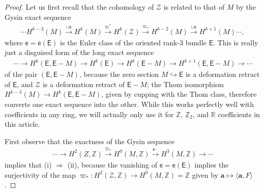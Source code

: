 \documentclass[pdftex]{sigma}
\numberwithin{equation}{section}
\def\ZZ{\mathbb{Z}}
\def\RR{\mathbb{R}}
\begin{document}
\begin{proof}
Let us first recall that the cohomology of
$\mathcal{Z}$ is related to that of $M$ by the Gysin exact sequence \cite[Section~12]{milnorstaf}
\begin{gather}\label{geyser}
 \cdots H^{k-3}(M)\stackrel{\cup \mathsf{e}}{\to} H^{k}(M)\stackrel{\varpi^*}{\to} H^{k}(\mathcal{Z})\stackrel{\varpi_*}{\to}
 H^{k-2}(M) \stackrel{\cup
 \mathsf{e}}{\to} H^{k+1}(M) \cdots,
\end{gather}
where $\mathsf{e}= \mathsf{e}( \mathsf{E})$ is the Euler class of the oriented rank-$3$ bundle $\mathsf{E}$.
This is really just a disguised form of the long exact sequence
\begin{gather*}
 \cdots \to H^{k}(\mathsf{E}, \mathsf{E}-M){\to} H^{k}(\mathsf{E}){\to} H^{k}(\mathsf{E}-M){\to}
 H^{k+1}(\mathsf{E}, \mathsf{E}-M) \to \cdots
\end{gather*}
of the pair $(\mathsf{E}, \mathsf{E}-M)$, because the zero section $M\hookrightarrow \mathsf{E}$ is a
deformation retract of $\mathsf{E}$, and $\mathcal{Z}$ is a deformation retract of $\mathsf{E}-M$; the Thom isomorphism
$H^{k-3} (M) \to H^{k} ( \mathsf{E}, \mathsf{E}-M)$, given by cupping with the Thom class, therefore
converts one exact sequence into the other.
While this works perfectly well with coefficients in any ring, we will actually only use it for $\ZZ$, $\ZZ_2$, and $\RR$ coefficients in this article.

First observe that the exactness of the
Gysin sequence
\begin{gather*}
\cdots \to H^2 (Z, \ZZ ) \stackrel{\varpi_*}{\to} H^0 (M, \ZZ ) \stackrel{\mathsf{e} \cdot}{\to}H^3 (M, \ZZ ) \to \cdots
\end{gather*}
implies that (i) $\Longrightarrow$ (ii), because the vanishing of $\mathsf{e}= \mathsf{e}(\mathsf{E})$
implies the surjectivity of the map
$\varpi_*\colon H^2( \mathcal{Z} , \ZZ )\to H^0 (M, \ZZ )=\ZZ$ given by $\mathbf{a} \mapsto \langle \mathbf{a}, F\rangle$.


\end{proof}
\end{document}
